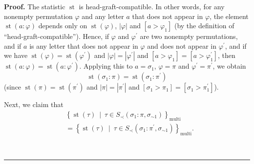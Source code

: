 \documentclass[numbers=enddot,12pt,final,onecolumn,notitlepage]{scrartcl}%
\theoremstyle{definition}
\newenvironment{proof}[1][Proof]{\noindent\textbf{#1.} }{\ \rule{0.5em}{0.5em}}
\begin{document}
\begin{proof}
The statistic $\operatorname*{st}$ is head-graft-compatible. In other words,
for any nonempty permutation $\varphi$ and any letter $a$ that does not appear
in $\varphi$, the element $\operatorname*{st}\left(  a:\varphi\right)  $
depends only on $\operatorname*{st}\left(  \varphi\right)  $, $\left\vert
\varphi\right\vert $ and $\left[  a>\varphi_{1}\right]  $ (by the definition
of \textquotedblleft head-graft-compatible\textquotedblright). Hence,
if $\varphi$ and $\varphi^{\prime}$ are two nonempty permutations, and if $a$
is any letter that does not appear in $\varphi$ and does not appear in
$\varphi^{\prime}$, and if we have $\operatorname*{st}\left(  \varphi\right)
=\operatorname*{st}\left(  \varphi^{\prime}\right)  $ and $\left\vert
\varphi\right\vert =\left\vert \varphi^{\prime}\right\vert $ and $\left[
a>\varphi_{1}\right]  =\left[  a>\varphi_{1}^{\prime}\right]  $, then
$\operatorname*{st}\left(  a:\varphi\right)  =\operatorname*{st}\left(
a:\varphi^{\prime}\right)  $. Applying this to $a=\sigma_{1}$, $\varphi=\pi$
and $\varphi^{\prime}=\pi^{\prime}$, we obtain
\[
\operatorname*{st}\left(  \sigma_{1}:\pi\right)  =\operatorname*{st}\left(
\sigma_{1}:\pi^{\prime}\right)
\]
(since $\operatorname*{st}\left(  \pi\right)  =\operatorname*{st}\left(
\pi^{\prime}\right)  $ and $\left\vert \pi\right\vert =\left\vert \pi^{\prime
}\right\vert $ and $\left[  \sigma_{1}>\pi_{1}\right]  =\left[  \sigma_{1}%
>\pi_{1}^{\prime}\right]  $).

Next, we claim that%
\begin{align}
&\left\{  \operatorname*{st}\left(  \tau\right)  \ \mid\ \tau\in S_{\prec
}\left(  \sigma_{1}:\pi,\sigma_{\sim1}\right)  \right\}
_{\operatorname*{multi}}
\nonumber\\
&=\left\{
\operatorname*{st}\left(  \tau\right)  \ \mid\ \tau\in S_{\prec}\left(
\sigma_{1}:\pi^{\prime},\sigma_{\sim1}\right)  \right\}
_{\operatorname*{multi}}.
\label{pf.thm.head-comp.LRcomp.c1.pf.5}%
\end{align}



\end{proof}
\end{document}
